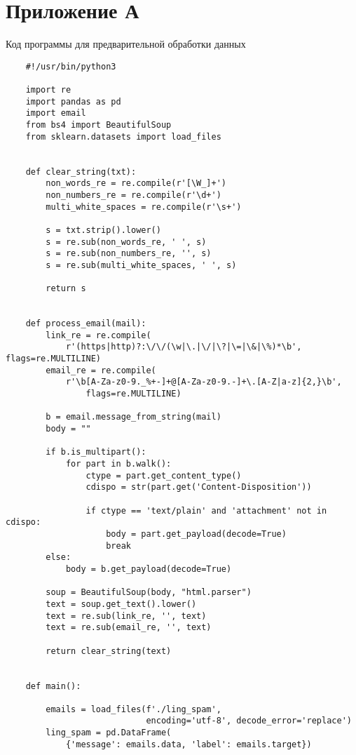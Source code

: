 \chapter*{Приложение А}\label{App1}
\begin{center}Код программы для предварительной обработки данных\end{center}
\begin{lstlisting}
    #!/usr/bin/python3

    import re
    import pandas as pd
    import email
    from bs4 import BeautifulSoup
    from sklearn.datasets import load_files
    
    
    def clear_string(txt):
        non_words_re = re.compile(r'[\W_]+')
        non_numbers_re = re.compile(r'\d+')
        multi_white_spaces = re.compile(r'\s+')
    
        s = txt.strip().lower()
        s = re.sub(non_words_re, ' ', s)
        s = re.sub(non_numbers_re, '', s)
        s = re.sub(multi_white_spaces, ' ', s)
    
        return s
    
    
    def process_email(mail):
        link_re = re.compile(
            r'(https|http)?:\/\/(\w|\.|\/|\?|\=|\&|\%)*\b', flags=re.MULTILINE)
        email_re = re.compile(
            r'\b[A-Za-z0-9._%+-]+@[A-Za-z0-9.-]+\.[A-Z|a-z]{2,}\b', 
                flags=re.MULTILINE)
    
        b = email.message_from_string(mail)
        body = ""
    
        if b.is_multipart():
            for part in b.walk():
                ctype = part.get_content_type()
                cdispo = str(part.get('Content-Disposition'))
    
                if ctype == 'text/plain' and 'attachment' not in cdispo:
                    body = part.get_payload(decode=True)
                    break
        else:
            body = b.get_payload(decode=True)
    
        soup = BeautifulSoup(body, "html.parser")
        text = soup.get_text().lower()
        text = re.sub(link_re, '', text)
        text = re.sub(email_re, '', text)
    
        return clear_string(text)
    
    
    def main():
    
        emails = load_files(f'./ling_spam',
                            encoding='utf-8', decode_error='replace')
        ling_spam = pd.DataFrame(
            {'message': emails.data, 'label': emails.target})
    

\end{lstlisting}

